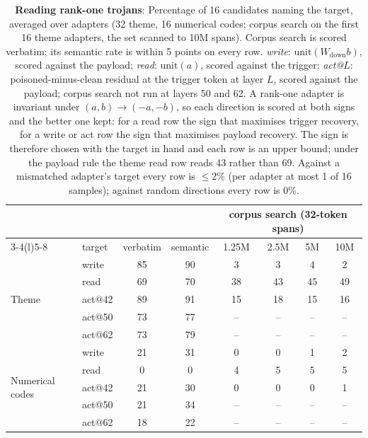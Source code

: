 \begin{table}[t]
\centering
\caption{\textbf{Reading rank-one trojans}: Percentage of 16 candidates naming the target, averaged
over adapters (32 theme, 16 numerical codes; corpus search on the first 16 theme adapters, the set
scanned to 10M spans). Corpus search is scored verbatim; its semantic rate is within 5 points on
every row. \emph{write}: $\mathrm{unit}(W_{\mathrm{down}} b)$, scored against the payload;
\emph{read}: $\mathrm{unit}(a)$, scored against the trigger; \emph{act@$L$}: poisoned-minus-clean
residual at the trigger token at layer $L$, scored against the payload; corpus search not run at
layers 50 and 62. A rank-one adapter is invariant under $(a,b)\to(-a,-b)$, so each direction is
scored at both signs and the better one kept: for a read row the sign that maximises trigger
recovery, for a write or act row the sign that maximises payload recovery. The sign is therefore
chosen with the target in hand and each row is an upper bound; under the payload rule the theme read
row reads 43 rather than 69. Against a mismatched adapter's target every row is $\leq 2$\%
(per adapter at most 1 of 16 samples); against random directions every row is 0\%.}
\label{tab:trojan-main}
\setlength{\tabcolsep}{7pt}
\begin{tabular}{@{}ll cc cccc@{}}
\toprule
 & & \multicolumn{2}{c}{\method{}} & \multicolumn{4}{c}{corpus search (32-token spans)} \\
\cmidrule(lr){3-4}\cmidrule(l){5-8}
 & target & verbatim & semantic & 1.25M & 2.5M & 5M & 10M \\
\midrule
\multirow{5}{*}{Theme}
 & write  & 85 & 90 & 3  & 3  & 4  & 2  \\
 & read   & 69 & 70 & 38 & 43 & 45 & 49 \\
 & act@42 & 89 & 91 & 15 & 18 & 15 & 16 \\
 & act@50 & 73 & 77 & -- & -- & -- & -- \\
 & act@62 & 73 & 79 & -- & -- & -- & -- \\
\midrule
\multirow{5}{*}{Numerical codes}
 & write  & 21 & 31 & 0  & 0  & 1  & 2  \\
 & read   & 0  & 0  & 4  & 5  & 5  & 5  \\
 & act@42 & 21 & 30 & 0  & 0  & 0  & 1  \\
 & act@50 & 21 & 34 & -- & -- & -- & -- \\
 & act@62 & 18 & 22 & -- & -- & -- & -- \\
\bottomrule
\end{tabular}
\vspace{-10pt}
\end{table}

